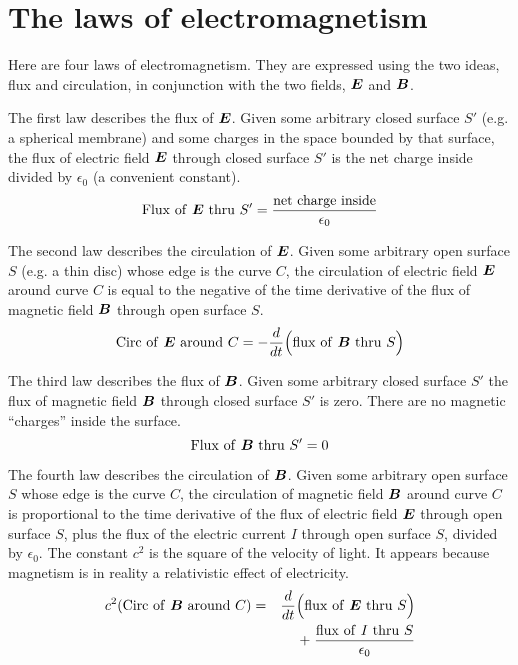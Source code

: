 \section{The laws of electromagnetism}

Here are four laws of electromagnetism.
They are expressed using the two ideas, flux and circulation,
in conjunction with the two fields, $\boldsymbol{E}$ and $\boldsymbol{B}$.

The first law describes the flux of $\boldsymbol{E}$.
Given some arbitrary closed surface $S'$ (e.g. a spherical membrane) 
and some charges in the space bounded by that surface,
the flux of electric field $\boldsymbol{E}$ through closed surface $S'$ is
the net charge inside divided by $\epsilon_0$ (a convenient constant).
\begin{equation}
  \mathrm{Flux\ of\ } \bv{E} \mathrm{\ thru\ } S' = 
  \frac{\mathrm{net\ charge\ inside}}{\epsilon_0}
\end{equation}

The second law describes the circulation of $\boldsymbol{E}$.
Given some arbitrary open surface $S$ (e.g. a thin disc) whose edge is the curve $C$,
the circulation of electric field $\boldsymbol{E}$ around curve $C$ is equal to the negative of
the time derivative of the flux of magnetic field $\boldsymbol{B}$ through open surface $S$.
\begin{equation}
  \mathrm{Circ\ of\ } \bv{E} \mathrm{\ around\ } C =
  -\frac{d}{dt} \Big( \mathrm{flux\ of\ } \bv{B} \mathrm{\ thru\ } S \Big)
\end{equation}

\newpage

The third law describes the flux of $\boldsymbol{B}$.
Given some arbitrary closed surface $S'$
the flux of magnetic field $\boldsymbol{B}$ through closed surface $S'$ is zero.
There are no magnetic ``charges'' inside the surface.
\begin{equation}
  \mathrm{Flux\ of\ } \boldsymbol{B} \mathrm{\ thru\ } S' = 0
\end{equation}

The fourth law describes the circulation of $\boldsymbol{B}$.
Given some arbitrary open surface $S$ whose edge is the curve $C$,
the circulation of magnetic field $\boldsymbol{B}$ around curve $C$ is proportional to 
the time derivative of the flux of electric field $\boldsymbol{E}$ through open surface $S$, plus
the flux of the electric current $I$ through open surface $S$, divided by $\epsilon_0$.
The constant $c^2$ is the square of the velocity of light.
It appears because magnetism is in reality a relativistic effect of electricity.
\begin{eqnarray}
  c^2 (\mathrm{Circ\ of\ } \bv{B} \mathrm{\ around\ } C)
  &=& \frac{d}{dt} \Big( \mathrm{flux\ of\ } \bv{E} \mathrm{\ thru\ } S \Big) \nonumber\\
  & & \quad  + \; \frac{\mathrm{flux\ of\ } I \mathrm{\ thru\ } S}{\epsilon_0}
\end{eqnarray}

